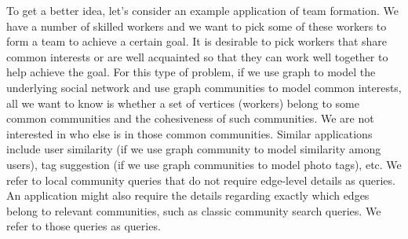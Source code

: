To get a better idea, let's consider an example application of team formation. We have a number of skilled workers and we want to pick some of these workers to form a team to achieve a certain goal. It is desirable to pick workers that share common interests or are well acquainted so that they can work well together to help achieve the goal. For this type of problem, if we use graph to model the underlying social network and use graph communities to model common interests, all we want to know is whether a set of vertices (workers) belong to some common communities and the cohesiveness of such communities. We are not interested in who else is in those common communities. Similar applications include user similarity (if we use graph community to model similarity among users), tag suggestion (if we use graph communities to model photo tags), etc. We refer to local community queries that do not require edge-level details as \toplevelprob{} queries. An application might also require the details regarding exactly which edges belong to relevant communities, such as classic community search queries. We refer to those queries as \bottomlevelprob{} queries.




